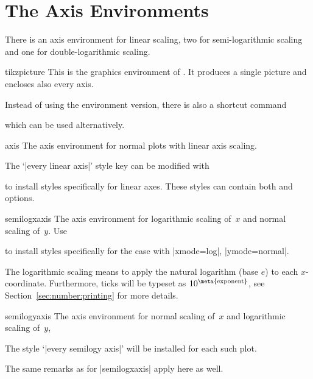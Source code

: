 
\section{The Axis Environments}

There is an axis environment for linear scaling, two for semi-logarithmic
scaling and one for double-logarithmic scaling.
%
\begin{environment}{{tikzpicture}}
    This is the graphics environment of \Tikz{}. It produces a single picture
    and encloses also every axis.

    Instead of using the environment version, there is also a shortcut command

    \declareandlabel{\tikz}

    which can be used alternatively.
\end{environment}

\begin{environment}{{axis}}
    The axis environment for normal plots with linear axis scaling.

    The `|every linear axis|' style key can be modified with
\begin{codeexample}
\end{codeexample}
    to install styles specifically for linear axes. These styles can contain
    both \Tikz{} and \PGFPlots{} options.
\end{environment}

\begin{environment}{{semilogxaxis}}
    The axis environment for logarithmic scaling of~$x$ and normal scaling
    of~$y$. Use
\begin{codeexample}
\end{codeexample}
    to install styles specifically for the case with |xmode=log|, |ymode=normal|.

    The logarithmic scaling means to apply the natural logarithm (base $e$) to
    each $x$-coordinate. Furthermore, ticks will be typeset as
    $10^{\text{\meta{exponent}}}$, see Section~\ref{sec:number:printing} for
    more details.
\end{environment}

\begin{environment}{{semilogyaxis}}
    The axis environment for normal scaling of~$x$ and logarithmic scaling
    of~$y$,

    The style `|every semilogy axis|' will be installed for each such plot.

    The same remarks as for |semilogxaxis| apply here as well.
\end{environment}

